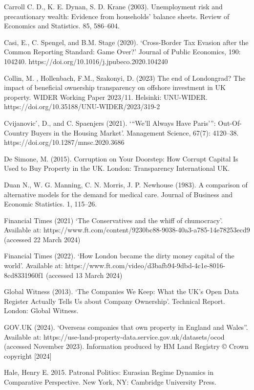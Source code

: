 \documentclass{article}
\begin{document}
\begin{thebibliography}{x}
\bibitem{}
Carroll C. D., K. E. Dynan, S. D. Krane (2003). Unemployment risk and precautionary wealth: Evidence from households’ balance sheets. Review of Economics and Statistics. 85, 586–604.

\bibitem{}
Casi, E., C. Spengel, and B.M. Stage (2020). ‘Cross-Border Tax Evasion after the Common Reporting Standard: Game Over?’ Journal of Public Economics, 190: 104240. https://doi.org/10.1016/j.jpubeco.2020.104240

\bibitem{}
Collin, M. , Hollenbach, F.M., Szakonyi, D. (2023) The end of Londongrad? The impact of beneficial ownership transparency on offshore investment in UK property. WIDER Working Paper 2023/11. Helsinki: UNU-WIDER. https://doi.org/10.35188/UNU-WIDER/2023/319-2

\bibitem{}
Cvijanovic ́, D., and C. Spaenjers (2021). ‘“We’ll Always Have Paris’”: Out-Of-Country Buyers in the Housing Market’. Management Science, 67(7): 4120–38. https://doi.org/10.1287/mnsc.2020.3686

\bibitem{}
De Simone, M. (2015). Corruption on Your Doorstep: How Corrupt Capital Is Used to Buy Property in the UK. London: Transparency International UK.

\bibitem{}
Duan N., W. G. Manning, C. N. Morris, J. P. Newhouse (1983). A comparison of alternative models for the demand for medical care. Journal of Business and Economic Statistics. 1, 115–26.

\bibitem{}
Financial Times (2021) ‘The Conservatives and the whiff of chumocracy’. Available at: https://www.ft.com/content/9230bc88-9038-40a3-a785-14e78253ecd9 (accessed 22 March 2024)

\bibitem{}
Financial Times (2022). ‘How London became the dirty money capital of the world’. Available at: https://www.ft.com/video/d3bafb94-9dbd-4c1e-8016-8cd8331960f1 (accessed 13 March 2024)

\bibitem{}
Global Witness (2013). ‘The Companies We Keep: What the UK’s Open Data Register Actually Tells Us about Company Ownership’. Technical Report. London: Global Witness.

\bibitem{}
GOV.UK (2024). ‘Overseas companies that own property in England and Wales”. Available at: https://use-land-property-data.service.gov.uk/datasets/ocod (accessed November 2023). Information produced by HM Land Registry © Crown copyright [2024]

\bibitem{}
Hale, Henry E. 2015. Patronal Politics: Eurasian Regime Dynamics in Comparative Perspective. New York, NY: Cambridge University Press.


\end{thebibliography}
\end{document}
